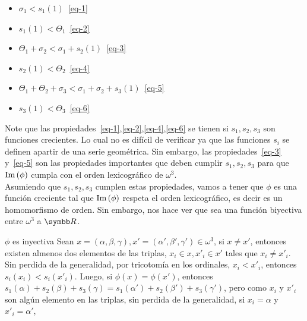 \documentclass{article}
\begin{document}
\begin{itemize}
        \vspace{-5ex}
        \begin{multicols}{2}
            \begin{itemize}
                \item \(\sigma_1 < s_1(1)\)~\eqref{eq-1}
                \item \(s_1(1) < \Theta_1\)~\eqref{eq-2}
                \item \(\Theta_1 + \sigma_2 < \sigma_1 + s_2(1)\)~\eqref{eq-3}
                \item \(s_2(1) < \Theta_2\)~\eqref{eq-4}
                \item \(\Theta_1 + \Theta_2 + \sigma_3 < \sigma_1 + \sigma_2 + s_3(1)\)~\eqref{eq-5}
                \item \(s_3(1) < \Theta_3\)~\eqref{eq-6}
            \end{itemize}
        \end{multicols}
        Note que las propiedades~\eqref{eq-1},\eqref{eq-2},\eqref{eq-4},\eqref{eq-6} se tienen si \(s_1, s_2, s_3\) son funciones crecientes. 
        Lo cual no es difícil de verificar ya que las funciones \(s_i\) se definen apartir de una serie geométrica. 
        Sin embargo, las propiedades~\eqref{eq-3} y~\eqref{eq-5} son las propiedades importantes que deben cumplir \(s_1, s_2, s_3\) para que \(\text{Im}\left( \phi \right)\) cumpla con el orden lexicográfico de \(\omega^3\).
        \\
        Asumiendo que \(s_1, s_2, s_3\) cumplen estas propiedades, vamos a tener que \(\phi\) es una función creciente tal que \(\text{Im}\left( \phi \right)\) respeta el orden lexicográfico, es decir es un homomorfismo de orden. 
        Sin embargo, nos hace ver que sea una función biyectiva entre \(\omega^3\) a \(\realR\).
        \ResetCases{}
        \begin{mathcase}{\(\phi\) es inyectiva}
            \vspace{-3ex}
            Sean \(x = (\alpha, \beta, \gamma), x' = (\alpha', \beta', \gamma') \in \omega^3\), si \(x \neq x'\), 
            entonces existen almenos dos elementos de las triplas, \(x_i \in x, x'_i \in x'\) tales que \(x_i \neq x'_i\).
            Sin perdida de la generalidad, por tricotomía en los ordinales, \(x_i < x'_i\), entonces \(s_i(x_i) < s_i(x'_i)\).
            Luego, si \(\phi(x) = \phi(x')\), entonces \(s_1(\alpha) + s_2(\beta) + s_3(\gamma) = s_1(\alpha') + s_2(\beta') + s_3(\gamma')\), 
            pero como \(x_i\) y \(x'_i\) son algún elemento en las triplas, sin perdida de la generalidad, si \(x_i = \alpha\) y \(x'_i = \alpha'\),

\end{mathcase}
\end{itemize}
\end{document}

